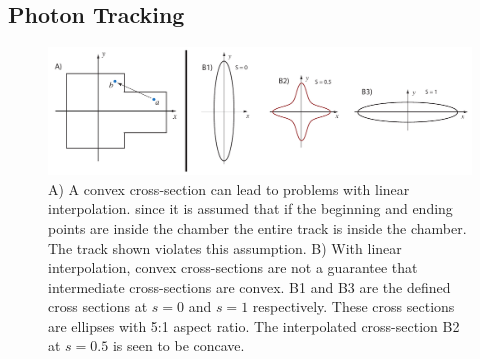 \documentclass[11pt]{article}
\begin{document}
\subsection{Photon Tracking}
\label{s:track}

\begin{figure}[tb]
\begin{center}
\includegraphics[width=6in]{chamber-problem.pdf}
\caption{A) A convex cross-section can lead to problems with linear interpolation.
since it is assumed that if the beginning and ending points are inside the chamber 
the entire track is inside the chamber. The track shown violates this assumption.
B) With linear interpolation, convex cross-sections are not a guarantee that 
intermediate cross-sections are convex. B1 and B3 are the defined cross sections 
at $s = 0$ and $s = 1$ respectively. These cross sections are ellipses with 5:1 
aspect ratio. The interpolated cross-section B2 at $s = 0.5$ is seen to be concave.}
\label{f:convex-chamber}
\end{center}
\end{figure}
\end{document}
